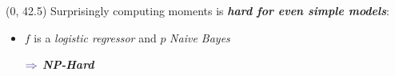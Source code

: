 \documentclass[final]{beamer}
\newcommand{\commenti}[3][\normalsize]{\hspace{50pt}\begin{minipage}{.9\linewidth}
          \raggedleft
          {
            $\color{violet}\boldsymbol\Rightarrow$
            #1
            {\emph{#2}}
          }
      \end{minipage}#3\\
}
\begin{document}
\begin{frame}{}
\begin{textblock}{39}(0, 42.5)
  \large
  Surprisingly computing moments is \emph{\textbf{hard for even simple models}}:\\[10pt]
  \hfill\begin{minipage}{0.94\linewidth}
  \begin{itemize}
    \setlength{\itemsep}{10pt}
  \item $f$ is a {\emph{logistic regressor}} and $p$
    \emph{{Naive Bayes}}\\[-50pt] %
    \commenti{{\textbf{NP-Hard}}~\cite{Khosravi2019}}{}    

\end{itemize}
\end{minipage}
\end{textblock}
\end{frame}
\end{document}

